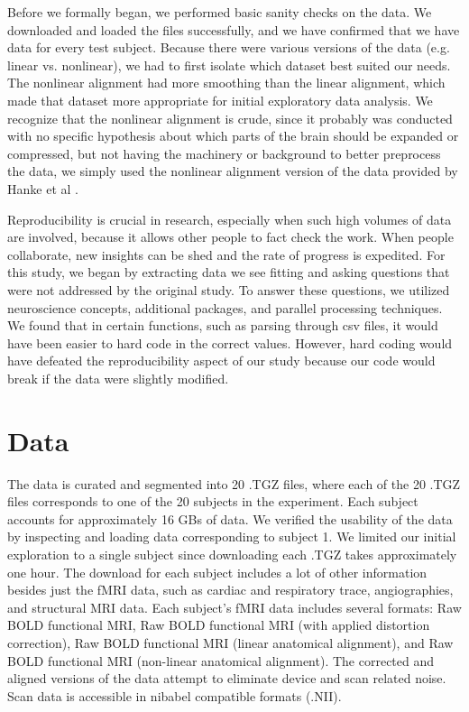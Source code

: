 \documentclass[11pt]{article}
\begin{document}
Before we formally began, we performed basic sanity checks on the data. We
downloaded and loaded the files successfully, and we have confirmed that we
have data for every test subject. Because there were various versions of the
data (e.g. linear vs. nonlinear), we had to first isolate which dataset best
suited our needs. The nonlinear alignment had more smoothing than the linear
alignment, which made that dataset more appropriate for initial exploratory
data analysis.  We recognize that the nonlinear alignment is crude, since it
probably was conducted with no specific hypothesis about which parts of the
brain should be expanded or compressed, but not having the machinery or
background to better preprocess the data, we simply used the nonlinear
alignment version of the data provided by Hanke et al
\cite{hank2014audiomovie}.

Reproducibility is crucial in research, especially when such high volumes of
data are involved, because it allows other people to fact check the work. When
people collaborate, new insights can be shed and the rate of progress is
expedited. For this study, we began by extracting data we see fitting and
asking questions that were not addressed by the original study. To answer
these questions, we utilized neuroscience concepts, additional packages, and
parallel processing techniques. We found that in certain functions, such as
parsing through csv files, it would have been easier to hard code in the
correct values. However, hard coding would have defeated the reproducibility
aspect of our study because our code would break if the data were slightly
modified.

\section{Data}

The data is curated and segmented into 20 .TGZ files, where each of the 20
.TGZ  files corresponds to one of the 20 subjects in the experiment. Each
subject  accounts for approximately 16 GBs of data. We verified the usability
of the data by inspecting and loading data corresponding to subject 1. We
limited our  initial exploration to a single subject since downloading each
.TGZ takes  approximately one hour.  The download for each subject includes a
lot of other information besides just the fMRI data, such as cardiac and
respiratory trace, angiographies, and structural MRI data. Each subject's fMRI
data includes several formats: Raw BOLD functional MRI, Raw BOLD functional
MRI (with applied distortion correction), Raw BOLD functional MRI (linear
anatomical alignment), and Raw BOLD functional MRI (non-linear anatomical
alignment). The corrected and aligned versions of the data attempt to
eliminate device and scan related noise. Scan data is accessible in nibabel
compatible formats (.NII).
\end{document}
